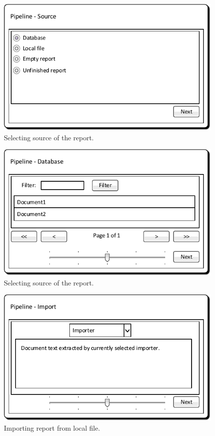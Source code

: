 \begin{figure}[!htb]
        \centering
        \includegraphics{Images/MockupPipelineSource}
        \caption{Selecting source of the report.}
        \label{fig:MockupPipelineSource}
\end{figure}

\begin{figure}[!htb]
        \centering
        \includegraphics{Images/MockupPipelineDatabase}
        \caption{Selecting source of the report.}
        \label{fig:MockupPipelineDatabase}
\end{figure}

\begin{figure}[!htb]
        \centering
        \includegraphics{Images/MockupPipelineImport}
        \caption{Importing report from local file.}
        \label{fig:MockupPipelineImport}
\end{figure}

